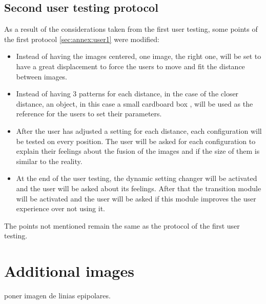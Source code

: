 \documentclass[10pt,a4paper,twocolumn,twoside]{article}
\begin{document}
	
	 
	\subsection{Second user testing protocol}
	\label{sec:annex:user2}
	
	As a result of the considerations taken from the first user testing, some points of the first protocol \ref{sec:annex:user1} were modified:
	\begin{itemize}
		\item Instead of having the images centered, one image, the right one, will be set to have a great displacement to force the users to move and fit the distance between images. 
		
		\item Instead of having 3 patterns for each distance, in the case of the closer distance, an object, in this case a small cardboard box , will be used as the reference for the users to set their parameters. 
		
		\item After the user has adjusted a setting for each distance, each configuration will be tested on every position. The user will be asked for each configuration to explain their feelings about the fusion of the images and if the size of them is similar to the reality. 
		
		\item At the end of the user testing, the dynamic setting changer will be activated and the user will be asked about its feelings. After that the transition module will be activated and the user will be asked if this module improves the user experience over not using it.  
	
	\end{itemize}

	The points not mentioned remain the same as the protocol of the first user testing.  
	
	\section{Additional images}
	
	poner imagen de linias epipolares.
	
\end{document}

